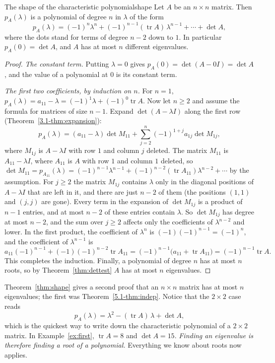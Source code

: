 \documentclass[11pt]{article}
\begin{document}
\begin{thm}{The shape of the characteristic polynomial}{shape}
Let $A$ be an $n\times n$ matrix. Then $p_A(\lambda)$ is a polynomial of degree $n$ in $\lambda$ of the form
\[
p_A(\lambda)=(-1)^n\lambda^n+(-1)^{n-1}(\operatorname{tr}A)\,\lambda^{n-1}+\cdots+\det A,
\]
where the dots stand for terms of degree $n-2$ down to $1$. In particular $p_A(0)=\det A$, and $A$ has at most $n$ different eigenvalues.
\end{thm}

\begin{proof}
\emph{The constant term.} Putting $\lambda=0$ gives $p_A(0)=\det(A-0I)=\det A$, and the value of a polynomial at $0$ is its constant term.

\emph{The first two coefficients, by induction on $n$.} For $n=1$, $p_A(\lambda)=a_{11}-\lambda=(-1)^1\lambda+(-1)^0\operatorname{tr}A$. Now let $n\ge2$ and assume the formula for matrices of size $n-1$. Expand $\det(A-\lambda I)$ along the first row (Theorem~\ref{3.1-thm:expansion}):
\[
p_A(\lambda)=(a_{11}-\lambda)\det M_{11}+\sum_{j=2}^{n}(-1)^{1+j}a_{1j}\det M_{1j},
\]
where $M_{1j}$ is $A-\lambda I$ with row $1$ and column $j$ deleted. The matrix $M_{11}$ is $A_{11}-\lambda I$, where $A_{11}$ is $A$ with row $1$ and column $1$ deleted, so $\det M_{11}=p_{A_{11}}(\lambda)=(-1)^{n-1}\lambda^{n-1}+(-1)^{n-2}(\operatorname{tr}A_{11})\lambda^{n-2}+\cdots$ by the assumption. For $j\ge2$ the matrix $M_{1j}$ contains $\lambda$ only in the diagonal positions of $A-\lambda I$ that are left in it, and there are just $n-2$ of them (the positions $(1,1)$ and $(j,j)$ are gone). Every term in the expansion of $\det M_{1j}$ is a product of $n-1$ entries, and at most $n-2$ of these entries contain $\lambda$. So $\det M_{1j}$ has degree at most $n-2$, and the sum over $j\ge2$ affects only the coefficients of $\lambda^{n-2}$ and lower. In the first product, the coefficient of $\lambda^n$ is $(-1)(-1)^{n-1}=(-1)^n$, and the coefficient of $\lambda^{n-1}$ is
\[
a_{11}(-1)^{n-1}+(-1)(-1)^{n-2}\operatorname{tr}A_{11}=(-1)^{n-1}\bigl(a_{11}+\operatorname{tr}A_{11}\bigr)=(-1)^{n-1}\operatorname{tr}A.
\]
This completes the induction. Finally, a polynomial of degree $n$ has at most $n$ roots, so by Theorem~\ref{thm:dettest} $A$ has at most $n$ eigenvalues.
\end{proof}

Theorem~\ref{thm:shape} gives a second proof that an $n\times n$ matrix has at most $n$ eigenvalues; the first was Theorem~\ref{5.1-thm:indep}. Notice that the $2\times2$ case reads
\[
p_A(\lambda)=\lambda^2-(\operatorname{tr}A)\,\lambda+\det A,
\]
which is the quickest way to write down the characteristic polynomial of a $2\times2$ matrix. In Example~\ref{ex:first}, $\operatorname{tr}A=8$ and $\det A=15$. \emph{Finding an eigenvalue is therefore finding a root of a polynomial.} Everything we know about roots now applies.
\end{document}
